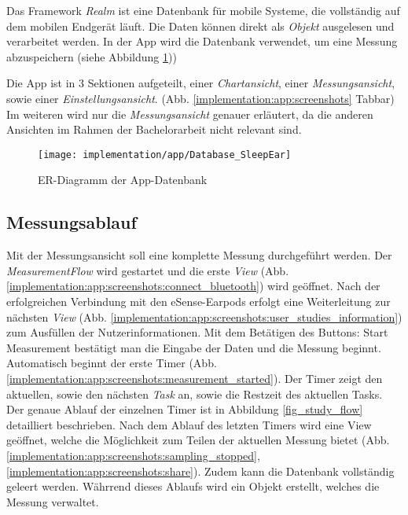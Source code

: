 Das Framework \textit{Realm} ist eine Datenbank für mobile Systeme, die vollständig auf dem mobilen Endgerät läuft.
Die Daten können direkt als \textit{Objekt} ausgelesen und verarbeitet werden.
In der App wird die Datenbank verwendet, um eine Messung abzuspeichern (siehe Abbildung \ref{implementation:app:erModel}))

Die App ist in 3 Sektionen aufgeteilt, einer \textit{Chartansicht}, einer \textit{Messungsansicht}, sowie einer \textit{Einstellungsansicht}. 
(Abb. \ref{implementation:app:screenshots} Tabbar)
Im weiteren wird nur die \textit{Messungsansicht} genauer erläutert, da die anderen Ansichten im Rahmen der Bachelorarbeit nicht relevant sind.

\begin{figure}[ht]
  \centering
  \texttt{[image: implementation/app/Database\_SleepEar]}
  \caption{ER-Diagramm der App-Datenbank}
  \label{implementation:app:erModel}
\end{figure}

\subsection{Messungsablauf}
\label{ch:Implementierung:app:measurement_procedure}
Mit der Messungsansicht soll eine komplette Messung durchgeführt werden.
Der \textit{MeasurementFlow} wird gestartet und die erste \textit{View} (Abb. \ref{implementation:app:screenshots:connect_bluetooth}) wird geöffnet.
Nach der erfolgreichen Verbindung mit den eSense-Earpods erfolgt eine Weiterleitung zur nächsten \textit{View} (Abb. \ref{implementation:app:screenshots:user_studies_information}) zum Ausfüllen der Nutzerinformationen. 
Mit dem Betätigen des Buttons: {\glqq Start Measurement\grqq} bestätigt man die Eingabe der Daten und die Messung beginnt.
Automatisch beginnt der erste Timer (Abb. \ref{implementation:app:screenshots:measurement_started}).
Der Timer zeigt den aktuellen, sowie den nächsten \textit{Task} an, sowie die Restzeit des aktuellen Tasks.
Der genaue Ablauf der einzelnen Timer ist in Abbildung \ref{fig_study_flow} detailliert beschrieben.
Nach dem Ablauf des letzten Timers wird eine View geöffnet, welche die Möglichkeit zum Teilen der aktuellen Messung bietet (Abb. \ref{implementation:app:screenshots:sampling_stopped}, \ref{implementation:app:screenshots:share}).
Zudem kann die Datenbank vollständig geleert werden.
Währrend dieses Ablaufs wird ein Objekt erstellt, welches die Messung verwaltet.

